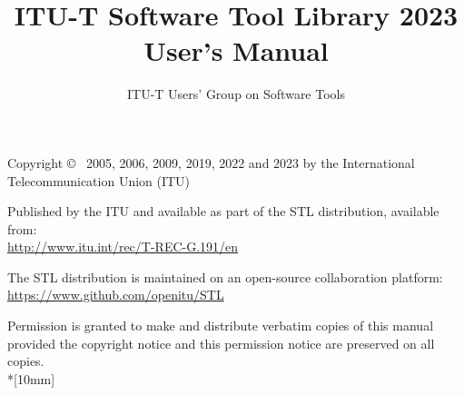 \documentclass[12pt,a4paper]{book}
\begin{document}
\SF

\def\sixsf{\footnotesize\tt}
\def\tenrm{\small\tt}
\def\twlsf{\sf}


\title{ITU-T Software Tool Library 2023 User's Manual}
\author{ITU-T Users' Group on Software Tools}

\maketitle
\thispagestyle{empty}


 Copyright \copyright~ 2005, 2006, 2009, 2019, 2022 and 2023 by the International
 Telecommunication Union (ITU)



Published by the ITU and available as part of the STL distribution, available from: \\
\url{http://www.itu.int/rec/T-REC-G.191/en}

The STL distribution is maintained on an open-source collaboration platform:\\
\url{https://www.github.com/openitu/STL}

Permission is granted to make and distribute verbatim copies of this manual provided the copyright notice and this permission notice are preserved on all copies.\\*[10mm]

\tableofcontents

\def\long{{\tt long}}

\cleardoublepage
{}
\setcounter{page}{1}



\end{document}
